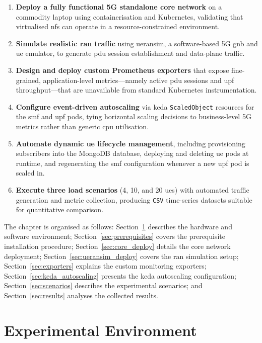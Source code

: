 \begin{enumerate}
  \item \textbf{Deploy a fully functional 5G standalone core network} on a commodity laptop using containerisation and Kubernetes, validating that virtualised \glspl{nf} can operate in a resource-constrained environment.
  \item \textbf{Simulate realistic \gls{ran} traffic} using \gls{ueransim}, a software-based 5G \gls{gnb} and \gls{ue} emulator, to generate \gls{pdu} session establishment and data-plane traffic.
  \item \textbf{Design and deploy custom Prometheus exporters} that expose fine-grained, application-level metrics—namely active \gls{pdu} sessions and \gls{upf} throughput—that are unavailable from standard Kubernetes instrumentation.
  \item \textbf{Configure event-driven autoscaling} via \gls{keda} \texttt{ScaledObject} resources for the \gls{smf} and \gls{upf} pods, tying horizontal scaling decisions to business-level 5G metrics rather than generic \gls{cpu} utilisation.
  \item \textbf{Automate dynamic \gls{ue} lifecycle management}, including provisioning subscribers into the MongoDB database, deploying and deleting \gls{ue} pods at runtime, and regenerating the \gls{smf} configuration whenever a new \gls{upf} pod is scaled in.
  \item \textbf{Execute three load scenarios} (4, 10, and 20 \glspl{ue}) with automated traffic generation and metric collection, producing \texttt{CSV} time-series datasets suitable for quantitative comparison.
\end{enumerate}

The chapter is organised as follows: Section~\ref{sec:env} describes the hardware and software environment; Section~\ref{sec:prerequisites} covers the prerequisite installation procedure; Section~\ref{sec:core_deploy} details the core network deployment; Section~\ref{sec:ueransim_deploy} covers the \gls{ran} simulation setup; Section~\ref{sec:exporters} explains the custom monitoring exporters; Section~\ref{sec:keda_autoscaling} presents the \gls{keda} autoscaling configuration; Section~\ref{sec:scenarios} describes the experimental scenarios; and Section~\ref{sec:results} analyses the collected results.

\section{Experimental Environment}
\label{sec:env}

